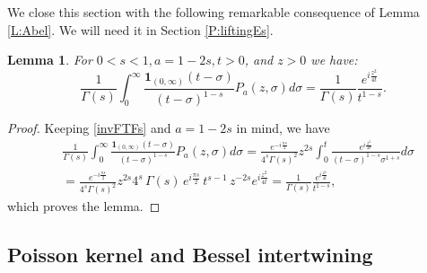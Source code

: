 \documentclass[11pt,letter]{amsart}
\def \G{\Gamma}
\numberwithin{equation}{section}
\newtheorem{lemma}[theorem]{Lemma}
\numberwithin{equation}{section}
\begin{document}
We close this section with the following remarkable consequence of Lemma \ref{L:Abel}. We will need it in Section \ref{P:liftingEs}.

\begin{lemma}\label{L:abepoi}
For $0<s<1, a = 1-2s, t>0$, and $z>0$ we have:
\begin{equation}\label{abepoi}
\frac{1}{\G(s)} \int_0^\infty \frac{\mathbf 1_{(0,\infty)}(t-\sigma)}{(t-\sigma)^{1-s}} P_a(z,\sigma) d\sigma = \frac{1}{\G(s)} \frac{e^{i \frac{z^2}{4t}}}{t^{1-s}}.
\end{equation}
\end{lemma}

\begin{proof} Keeping \eqref{invFTFs} and $a = 1-2s$ in mind, we have
\begin{align*}
& \frac{1}{\G(s)} \int_0^\infty \frac{\mathbf 1_{(0,\infty)}(t-\sigma)}{(t-\sigma)^{1-s}} P_a(z,\sigma) d\sigma = \frac{e^{-i\frac{\pi s}{2}}}{4^s\G(s)^2}
z^{2s} \int_0^t 
\frac{e^{i\frac{z^2}{4\sigma}}}{(t-\sigma)^{1-s} \sigma^{1+s}} d\sigma
\\
& = \frac{e^{-i\frac{\pi s}{2}}}{4^s\G(s)^2}
z^{2s}  4^s\,\G(s)\,e^{i\frac{\pi s}{2}}\,t^{s-1}\,z^{-2s}
e^{i \frac{z^2}{4t}} = \frac{1}{\G(s)} \frac{e^{i \frac{z^2}{4t}}}{t^{1-s}},
\end{align*}
which proves the lemma.

\end{proof}



\vskip 0.2in

\subsection{Poisson kernel and Bessel intertwining}\label{S:ep}
\end{document}
